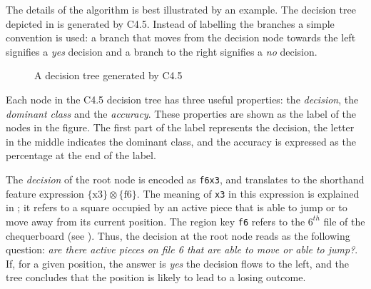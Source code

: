 \documentclass[twoside,11pt]{article}
\begin{document}
The details of the algorithm is best illustrated by an example.  The decision tree depicted in  is generated by C4.5. Instead of labelling the branches a simple convention is used: a branch that moves from the decision node towards the left signifies a {\sl yes} decision and a branch to the right signifies a {\sl no} decision. 
\begin{figure} [htb]
\center
\tiny
{}
{
		{
				{
						{
								{
										{
												{
														{
																{
																		{
																				{
																						{
																						}
																				}
																		}
																}
														}
												}
										}
								}
						}
				}
		}
}
\caption{A decision tree generated by C4.5}
\label{fig:dec_tree}
\end{figure}
Each node in the C4.5 decision tree has three useful properties: the {\sl decision}, the {\sl dominant class} and the {\sl accuracy}.  These properties are shown as the label of the nodes in the figure.  The first part of the label represents the decision, the letter in the middle indicates the dominant class, and the accuracy is expressed as the percentage at the end of the label. 

The {\sl decision} of the root node is encoded as {\tt f6x3}, and translates to the shorthand feature expression 
$\{\mbox{x3}\} \otimes \{\mbox{f6}\}$. 
The meaning of {\tt x3} in this expression is explained in ;  it refers to a square occupied by an active piece that is able to jump or to move away from its current position. The region key {\tt f6} refers to the  $6^{th}$ file of the chequerboard (see ). Thus, the decision at the root node reads as the following question: {\it are there active pieces on file 6 that are able to move or able to jump?}.  If, for a given position, the answer is {\it yes} the decision flows to the left, and the tree concludes that the position is likely to lead to a losing outcome.  
\end{document}
